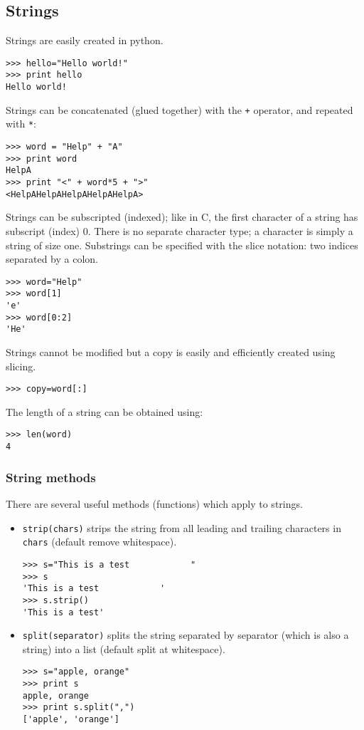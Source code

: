\documentclass[10pt,a4paper]{article}
\begin{document}
\subsection{Strings}
Strings are easily created in python.
\begin{lstlisting}
>>> hello="Hello world!"
>>> print hello
Hello world!
\end{lstlisting}
Strings can be concatenated (glued together) with the \verb|+| operator, and repeated with \verb|*|:
\begin{lstlisting}
>>> word = "Help" + "A"
>>> print word
HelpA
>>> print "<" + word*5 + ">"
<HelpAHelpAHelpAHelpAHelpA>
\end{lstlisting}
Strings can be subscripted (indexed); like in C, the first character of a string has subscript (index) 0. There is no separate character type; a character is simply a string of size one. Substrings can be specified with the slice notation: two indices separated by a colon.
\begin{lstlisting}
>>> word="Help"
>>> word[1]
'e'
>>> word[0:2]
'He'
\end{lstlisting}
Strings cannot be modified but a copy is easily and efficiently created using slicing.
\begin{lstlisting}
>>> copy=word[:]
\end{lstlisting}
The length of a string can be obtained using:
\begin{lstlisting}
>>> len(word)
4
\end{lstlisting}
\subsubsection{String methods}
There are several useful methods (functions) which apply to strings.
\begin{itemize}
\item \verb|strip(chars)| strips the string from all leading and trailing characters in \verb|chars| (default remove whitespace).
\begin{lstlisting}
>>> s="This is a test            "
>>> s
'This is a test            '
>>> s.strip()
'This is a test'
\end{lstlisting}
\item \verb|split(separator)| splits the string separated by separator (which is also a string) into a list (default split at whitespace).
\begin{lstlisting}
>>> s="apple, orange"
>>> print s
apple, orange
>>> print s.split(",")
['apple', 'orange']
\end{lstlisting}
\end{itemize}
\end{document}
